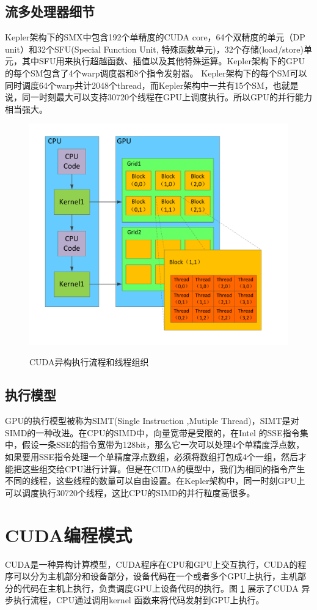 \subsection{流多处理器细节}
Kepler架构下的SMX中包含192个单精度的CUDA core，64个双精度的单元（DP unit）和32个SFU(Special Function Unit, 特殊函数单元)，32个存储(load/store)单元，其中SFU用来执行超越函数、插值以及其他特殊运算。Kepler架构下的GPU的每个SM包含了4个warp调度器和8个指令发射器。 Kepler架构下的每个SM可以同时调度64个warp共计2048个thread，而Kepler架构中一共有15个SM，也就是说，同一时刻最大可以支持30720个线程在GPU上调度执行。所以GPU的并行能力相当强大。
\begin{figure}
\setlength{\abovecaptionskip}{-0.5cm}
\begin{center}
{\includegraphics[width=0.7 \textwidth]{figures/block.pdf}}
\end{center}
\caption{{\footnotesize{CUDA异构执行流程和线程组织}}}
\label{ktz}
\end{figure}
\subsection{执行模型}
GPU的执行模型被称为SIMT(Single Instruction ,Mutiple Thread)，SIMT是对SIMD的一种改进。在CPU的SIMD中，向量宽带是受限的，在Intel 的SSE指令集中，假设一条SSE的指令宽带为128bit，那么它一次可以处理4个单精度浮点数，如果要用SSE指令处理一个单精度浮点数组，必须将数组打包成4个一组，然后才能把这些组交给CPU进行计算。但是在CUDA的模型中，我们为相同的指令产生不同的线程，这些线程的数量可以自由设置。在Kepler架构中，同一时刻GPU上可以调度执行30720个线程，这比CPU的SIMD的并行粒度高很多。

\section{CUDA编程模式}
CUDA是一种异构计算模型，CUDA程序在CPU和GPU上交互执行，CUDA的程序可以分为主机部分和设备部分，设备代码在一个或者多个GPU上执行，主机部分的代码在主机上执行，负责调度GPU上设备代码的执行。图 \ref{ktz} 展示了CUDA 异步执行流程，CPU通过调用kernel 函数来将代码发射到GPU上执行。

